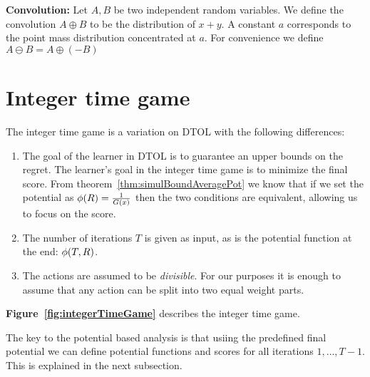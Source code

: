 \documentclass{article}[12pt]
\begin{document}
{\bf Convolution:} Let $A,B$ be two independent random variables. We define the
convolution $A \oplus B$ to be the distribution of $x+y$. A constant
$a$ corresponds to the point mass distribution concentrated at
$a$. For convenience we define $A \ominus B = A \oplus (-B)$


\section{Integer time game}

The integer time game is a variation on DTOL with the following
differences:
\begin{enumerate}
\item The goal of the learner in DTOL is to guarantee an upper bounds
  on the regret. The learner's goal in the integer time game is to
  minimize the final score. From theorem~\ref{thm:simulBoundAveragePot} we know that if
  we set the potential as $\phi(R) = \frac{1}{G(x)}$ then the two
  conditions are equivalent, allowing us to focus on the score.
\item The number of iterations $T$ is given as input, as is the
  potential function at the end: $\phi(T,R)$.
\item The actions are assumed to be {\em divisible}. For our purposes
it is enough to assume that any action can be split into two equal
weight parts.
\end{enumerate}

{\bf Figure~\ref{fig:integerTimeGame}} describes the integer time
game.

The key to the potential based analysis is that usiing the predefined
final potential we can define potential functions and scores for all
iterations $1,\ldots,T-1$. This is explained in the next subsection.
\end{document}
